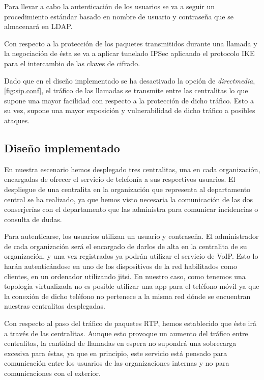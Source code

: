 \documentclass[a4paper]{article}
\begin{document}
 
Para llevar a cabo la autenticación de los usuarios se va a seguir un procedimiento estándar basado en nombre de usuario y contraseña que se almacenará en LDAP. 

 
Con respecto a la protección de los paquetes transmitidos durante una llamada y la
negociación de ésta se va a aplicar tunelado IPSec aplicando el protocolo IKE para el intercambio de las claves de cifrado.

  
Dado que en el diseño implementado se ha desactivado la opción de \textit{directmedia},\ref{fig:sip.conf}, el tráfico de las llamadas se transmite entre las centralitas lo que supone una mayor facilidad con respecto a la protección de dicho tráfico. Esto a su vez, supone una mayor exposición y vulnerabilidad de dicho tráfico a posibles ataques.

\subsection{Diseño implementado}

En nuestra escenario hemos desplegado tres centralitas, una en cada organización, encargadas de ofrecer el servicio de telefonía a sus respectivos usuarios. El despliegue de una centralita en la organización que representa al departamento central se ha realizado, ya que hemos visto necesaria la comunicación de las dos conserjerías con el departamento que las administra para comunicar incidencias o consulta de dudas.

 
Para autenticarse, los usuarios utilizan un usuario y contraseña. El administrador de cada organización será el encargado de darlos de alta en la centralita de su organización, y una vez registrados ya podrán utilizar el servicio de VoIP. Esto lo harán autenticándose en uno de los dispositivos de la red habilitados como clientes, en un ordenador utilizando jitsi. En nuestro caso, como tenemos una topología virtualizada no es posible utilizar una app para el teléfono móvil ya que la conexión de dicho teléfono no pertenece a la misma red dónde se encuentran nuestras centralitas desplegadas.

 
Con respecto al paso del tráfico de paquetes RTP, hemos establecido que éste irá a través de las centralitas. Aunque esto provoque un aumento del tráfico entre centralitas, la cantidad de llamadas en espera no supondrá una sobrecarga excesiva para éstas, ya que en principio, este servicio está pensado para comunicación entre los usuarios de las organizaciones internas y no para comunicaciones con el exterior.
\end{document}
